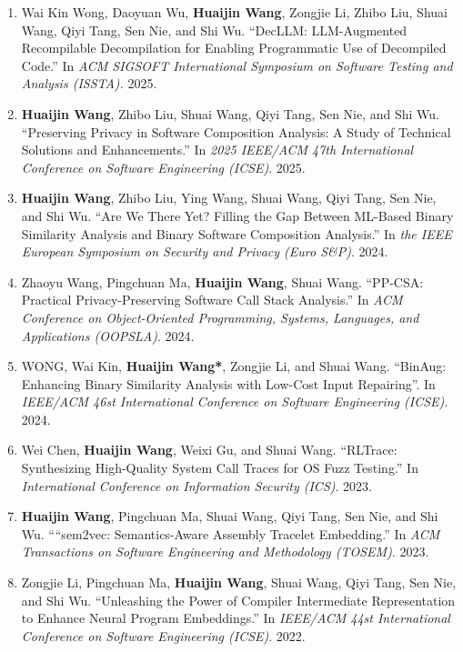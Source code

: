 \begin{enumerate}
    \item Wai Kin Wong, Daoyuan Wu, \textbf{Huaijin Wang}, Zongjie Li, Zhibo Liu, Shuai Wang, Qiyi Tang, Sen Nie, and Shi Wu.
    ``DecLLM: LLM-Augmented Recompilable Decompilation for Enabling Programmatic Use of Decompiled Code.''
    In \textit{ACM SIGSOFT International Symposium on Software Testing and Analysis (ISSTA).} 2025.

    \item \textbf{Huaijin Wang}, Zhibo Liu, Shuai Wang, Qiyi Tang, Sen Nie, and Shi Wu.
    ``Preserving Privacy in Software Composition Analysis: A Study of Technical Solutions and Enhancements.''
    In \textit{2025 IEEE/ACM 47th International Conference on Software Engineering (ICSE)}. 2025.

    \item \textbf{Huaijin Wang}, Zhibo Liu, Ying Wang, Shuai Wang, Qiyi Tang, Sen Nie, and Shi Wu.
    ``Are We There Yet? Filling the Gap Between ML-Based Binary Similarity Analysis and Binary Software Composition Analysis.''
    In \textit{the IEEE European Symposium on Security and Privacy (Euro S\&P)}. 2024.
    
    \item Zhaoyu Wang, Pingchuan Ma, \textbf{Huaijin Wang}, Shuai Wang.
    ``PP-CSA: Practical Privacy-Preserving Software Call Stack Analysis.''
    In \textit{ACM Conference on Object-Oriented Programming, Systems, Languages, and Applications (OOPSLA)}. 2024.
    
    \item WONG, Wai Kin, \textbf{Huaijin Wang*}, Zongjie Li, and Shuai Wang.
    ``BinAug: Enhancing Binary Similarity Analysis with Low-Cost Input Repairing''.
    In \textit{IEEE/ACM 46st International Conference on Software Engineering (ICSE)}. 2024.
    
    \item Wei Chen, \textbf{Huaijin Wang}, Weixi Gu, and Shuai Wang.
    ``RLTrace: Synthesizing High-Quality System Call Traces for OS Fuzz Testing.''
    In \textit{International Conference on Information Security (ICS)}. 2023.
    
    \item \textbf{Huaijin Wang}, Pingchuan Ma, Shuai Wang, Qiyi Tang, Sen Nie, and Shi Wu.
    ``“sem2vec: Semantics-Aware Assembly Tracelet Embedding.''
    In \textit{ACM Transactions on Software Engineering and Methodology (TOSEM)}. 2023.
    
    \item Zongjie Li, Pingchuan Ma, \textbf{Huaijin Wang}, Shuai Wang, Qiyi Tang, Sen Nie, and Shi Wu.
    ``Unleashing the Power of Compiler
    Intermediate Representation to Enhance Neural Program Embeddings.''
    In \textit{IEEE/ACM 44st International Conference on Software Engineering (ICSE)}. 2022.
    

\end{enumerate}
